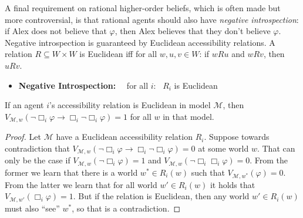 \documentclass[nobib,nofonts]{tufte-handout}
\newcommand{\Model}{\ensuremath{\mathcal{M}}}
\begin{document}
A final requirement on rational higher-order beliefs, which is often made but more controversial, is that rational agents should also have \emph{negative introspection}: if Alex does not believe that $\varphi$, then Alex believes that they don't believe $\varphi$.
Negative introspection is guaranteed by Euclidean accessibility relations.
A relation $R \subseteq W \times W$ is Euclidean iff for all $w,u,v \in W$: if $wRu$ and $wRv$, then $uRv$.
\begin{itemize}[]
  \item \textbf{Negative Introspection:} \ \  for all $i$: \ $R_{i}$ is Euclidean
\end{itemize}
\begin{claim}
 If an agent $i$'s accessibility relation is Euclidean in model $\Model$, then $V_{\Model,w}(\neg \Box_{i}\varphi \rightarrow \Box_{i} \neg \Box_{i}\varphi) = 1$ for all $w$ in that model.
\end{claim}
\begin{proof}
  Let $\Model$ have a Euclidean accessibility relation $R_{i}$.
  Suppose towards contradiction that $V_{\Model,w}(\neg \Box_{i}\varphi \rightarrow \Box_{i} \neg \Box_{i}\varphi) = 0$ at some world $w$.
  That can only be the case if $V_{\Model,w}( \neg \Box_{i}\varphi) = 1$ and $V_{\Model,w}( \neg \Box_{i}\Box_{i}\varphi) = 0$.
  From the former we learn that there is a world $w^{*} \in R_{i}(w)$ such that $V_{\Model, w^{*}}(\varphi)=0$.
  From the latter we learn that for all world $w' \in R_{i}(w)$ it holds that $V_{\Model,w'}(\Box_{i}\varphi) = 1$.
  But if the relation is Euclidean, then any world $w' \in R_{i}(w)$ must also ``see'' $w^{*}$, so that is a contradiction.
\end{proof}
\end{document}
